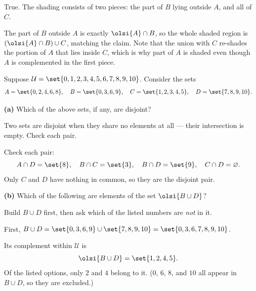 \documentclass[12pt]{ximera}
\begin{document}
\begin{problem}
\begin{prompt}
\begin{feedback}
True. The shading consists of two pieces: the part of $B$ lying outside $A$, and all
of $C$.

The part of $B$ outside $A$ is exactly $\olsi{A}\cap B$, so the whole shaded region
is $\left(\olsi{A}\cap B\right)\cup C$, matching the claim. Note that the union with
$C$ re-shades the portion of $A$ that lies inside $C$, which is why part of $A$ is
shaded even though $A$ is complemented in the first piece.
\end{feedback}
\end{prompt}
\end{problem}

\begin{problem}
Suppose $\mathcal{U}=\set{0,1,2,3,4,5,6,7,8,9,10}$. Consider the sets
\[
A= \set{0,2,4,6,8},\quad B= \set{0,3,6,9},\quad C= \set{1,2,3,4,5},\quad D= \set{7,8,9,10}.
\]

\begin{prompt}
\textbf{(a)} Which of the above sets, if any, are disjoint?

\begin{multipleChoice}
\end{multipleChoice}

\begin{hint}
Two sets are disjoint when they share no elements at all --- their intersection is
empty. Check each pair.
\end{hint}

\begin{feedback}
Check each pair:
\[
A\cap D=\set{8},\quad B\cap C=\set{3},\quad B\cap D=\set{9},\quad C\cap D=\varnothing.
\]
Only $C$ and $D$ have nothing in common, so they are the disjoint pair.
\end{feedback}
\end{prompt}

\begin{prompt}
\textbf{(b)} Which of the following are elements of the set $\olsi{B\cup D}$?

\begin{selectAll}
\end{selectAll}

\begin{hint}
Build $B\cup D$ first, then ask which of the listed numbers are \emph{not} in it.
\end{hint}

\begin{feedback}
First, $B\cup D=\set{0,3,6,9}\cup\set{7,8,9,10}=\set{0,3,6,7,8,9,10}$.

Its complement within $\mathcal{U}$ is
\[ \olsi{B\cup D}=\set{1,2,4,5}. \]
Of the listed options, only $2$ and $4$ belong to it. ($0$, $6$, $8$, and $10$ all
appear in $B\cup D$, so they are excluded.)
\end{feedback}
\end{prompt}
\end{problem}
\end{document}
